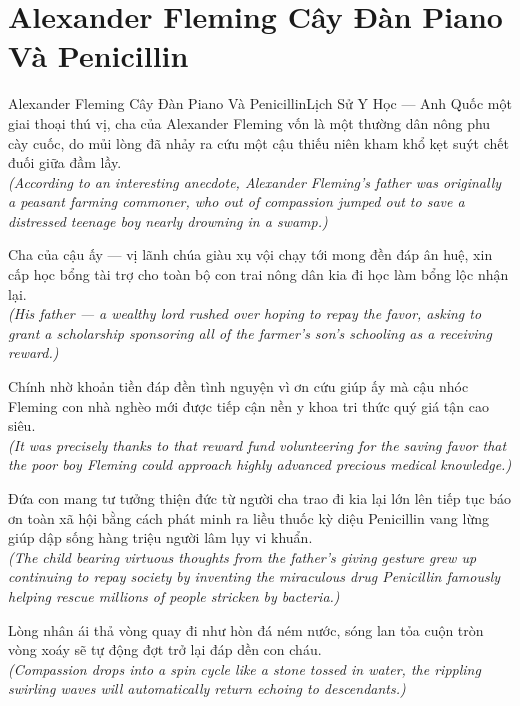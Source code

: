 \section{Alexander Fleming Cây Đàn Piano Và Penicillin}
\begin{truyen}{Alexander Fleming Cây Đàn Piano Và Penicillin}{Lịch Sử Y Học --- Anh Quốc}
 một giai thoại thú vị, cha của Alexander Fleming vốn là một thường dân nông phu cày cuốc, do mủi lòng đã nhảy ra cứu một cậu thiếu niên kham khổ kẹt suýt chết đuối giữa đầm lầy.\\[4pt]
\textit{(According to an interesting anecdote, Alexander Fleming's father was originally a peasant farming commoner, who out of compassion jumped out to save a distressed teenage boy nearly drowning in a swamp.)}

Cha của cậu ấy --- vị lãnh chúa giàu xụ vội chạy tới mong đền đáp ân huệ, xin cấp học bổng tài trợ cho toàn bộ con trai nông dân kia đi học làm bổng lộc nhận lại.\\[4pt]
\textit{(His father --- a wealthy lord rushed over hoping to repay the favor, asking to grant a scholarship sponsoring all of the farmer's son's schooling as a receiving reward.)}

Chính nhờ khoản tiền đáp đền tình nguyện vì ơn cứu giúp ấy mà cậu nhóc Fleming con nhà nghèo mới được tiếp cận nền y khoa tri thức quý giá tận cao siêu.\\[4pt]
\textit{(It was precisely thanks to that reward fund volunteering for the saving favor that the poor boy Fleming could approach highly advanced precious medical knowledge.)}

Đứa con mang tư tưởng thiện đức từ người cha trao đi kia lại lớn lên tiếp tục báo ơn toàn xã hội bằng cách phát minh ra liều thuốc kỳ diệu Penicillin vang lừng giúp dập sống hàng triệu người lâm lụy vi khuẩn.\\[4pt]
\textit{(The child bearing virtuous thoughts from the father's giving gesture grew up continuing to repay society by inventing the miraculous drug Penicillin famously helping rescue millions of people stricken by bacteria.)}

\end{truyen}
\begin{baihoc}
  Lòng nhân ái thả vòng quay đi như hòn đá ném nước, sóng lan tỏa cuộn tròn vòng xoáy sẽ tự động đợt trở lại đáp dền con cháu.\\[4pt]
  \textit{(Compassion drops into a spin cycle like a stone tossed in water, the rippling swirling waves will automatically return echoing to descendants.)}
\end{baihoc}

